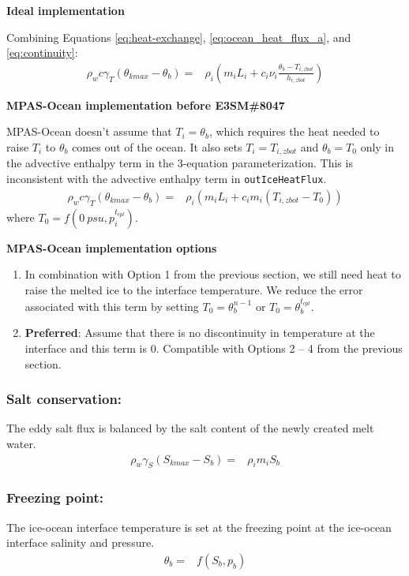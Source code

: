 \documentclass[11pt]{report}
\newcommand{\bea}{\begin{eqnarray}}
\newcommand{\eea}{\end{eqnarray}}
\begin{document}
\textbf{Ideal implementation}

Combining Equations \ref{eq:heat-exchange}, \ref{eq:ocean_heat_flux_a}, and \ref{eq:continuity}:
\bea
    \rho_w c \gamma_T(\theta_{kmax} - \theta_b) =& \rho_i( m_i L_i + c_i \nu_i \frac{\theta_b - T_{i,zbot}}{h_{i,zbot}})\label{eq:3eqn-heat}
\eea

\textbf{MPAS-Ocean implementation before E3SM\#8047}

MPAS-Ocean doesn't assume that $T_i = \theta_b$, which requires the heat needed to raise $T_i$ to $\theta_b$ comes out of the ocean. It also sets $T_i = T_{i,zbot}$ and $\theta_b = T_0$ only in the advective enthalpy term in the 3-equation parameterization. This is inconsistent with the advective enthalpy term in \texttt{outIceHeatFlux}.
\bea
    \rho_w c \gamma_T(\theta_{kmax} - \theta_b) =& \rho_i( m_i L_i + c_i m_i (T_{i,zbot} - T_0))\label{eq:3eqn-heat-pre8047}
\eea
where $T_0 =f(0\:psu, p_i^{t_{cpl}})$.

\textbf{MPAS-Ocean implementation options}

\begin{enumerate}
    \item In combination with Option 1 from the previous section, we still need heat to raise the melted ice to the interface temperature. We reduce the error associated with this term by setting $T_0 = \theta_b^{n-1}$ or $T_0 = \theta_b^{t_{cpl}}$.
    \item \textbf{Preferred}: Assume that there is no discontinuity in temperature at the interface and this term is 0. Compatible with Options 2 -- 4 from the previous section.
\end{enumerate}

\subsubsection{Salt conservation:}

The eddy salt flux is balanced by the salt content of the newly created melt water.
\bea
    \rho_w \gamma_S(S_{kmax} - S_b) =& \rho_i m_i S_b \label{eq:3eqn-salt}
\eea

\subsubsection{Freezing point:}
The ice-ocean interface temperature is set at the freezing point at the ice-ocean interface salinity and pressure.
\bea
    \theta_b =& f(S_b, p_b)\label{eq:freezing}
\eea
\end{document}
